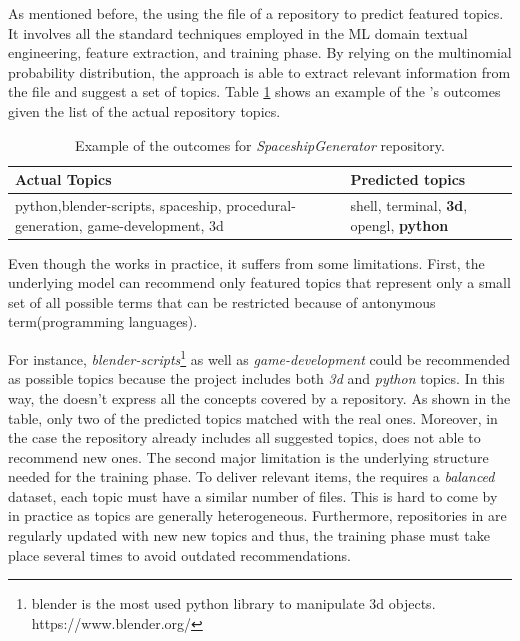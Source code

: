 As mentioned before, the \MNB using the \RM file of a repository to predict featured topics. It involves all the standard techniques employed in the ML domain \ie textual engineering, feature extraction, and training phase. By relying on the multinomial probability distribution, the approach is able to extract relevant information from the \RM file and suggest a set of topics. Table \ref{tab:example} shows an example of the \MNB's outcomes given the list of the actual repository topics. 

\begin{table}[h]
\centering

\resizebox{8.5cm}{!} {

\begin{tabular}{| p{3.2cm} | p{3.2cm} | }
\hline
 \textbf{Actual Topics} &\textbf{ Predicted topics} \\ \hline
     python,blender-scripts, spaceship, procedural-generation, game-development, 3d        &  
  shell, terminal, \textbf{3d},	opengl,	\textbf{python}        \\ \hline

\end{tabular}
}
\caption{Example of the \MNB outcomes for \emph{SpaceshipGenerator} repository.}
\label{tab:example}
\end{table} 



Even though the \MNB works in practice, it suffers from some limitations. First, the underlying model can recommend only featured topics that represent only a small set of all possible terms that can be restricted because of antonymous term(\eg programming languages).

For instance, \emph{blender-scripts}\footnote{blender is the most used python library to manipulate 3d objects. \url{}https://www.blender.org/} as well as \emph{game-development} could be recommended as possible topics because the project includes both \emph{3d} and \emph{python} topics.
In this way, the \MNB doesn't express all the concepts covered by a \GH repository. As shown in the table, only two of the predicted topics matched with the real ones. Moreover, in the case the repository already includes all suggested topics, \MNB does not able to recommend new ones.
The second major limitation is the underlying structure needed for the training phase. To deliver relevant items, the \MNB requires a \emph{balanced} dataset, \ie each topic must have a similar number of  \RM files. This is hard to come by in practice as topics are generally heterogeneous.
Furthermore, repositories in \GH are regularly updated with new new topics and thus, the training phase must take place several times to avoid outdated recommendations. 

